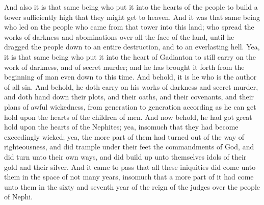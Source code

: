 And also it is that same being who put it into the hearts of the people to build a tower sufficiently high that they might get to heaven. And it was that same being who led on the people who came from that tower into this land; who spread the works of darkness and abominations over all the face of the land, until he dragged the people down to an entire destruction, and to an everlasting hell.
\bverse \iffalse Yea, it is that same being who put it into the heart of Gadianton to still carry on the work of darkness, and of secret murder; and he has brought it forth from the beginning of man even down to this time. \fi
Yea, it is that same being who put it into the heart of Gadianton to still carry on the work of darkness, and of secret murder; and he has brought it forth from the beginning of man even down to this time.
\bverse \iffalse And behold, it is he who is the author of all sin. And behold, he doth carry on his works of darkness and secret murder, and doth hand down their plots, and their oaths, and their covenants, and their plans of awful wickedness, from generation to generation according as he can get hold upon the hearts of the children of men. \fi
And behold, it is he who is the author of all sin. And behold, he doth carry on his works of darkness and secret murder, and doth hand down their plots, and their oaths, and their covenants, and their plans of awful wickedness, from generation to generation according as he can get hold upon the hearts of the children of men.
\bverse \iffalse And now behold, he had got great hold upon the hearts of the Nephites; yea, insomuch that they had become exceedingly wicked; yea, the more part of them had turned out of the way of righteousness, and did trample under their feet the commandments of God, and did turn unto their own ways, and did build up unto themselves idols of their gold and their silver. \fi
And now behold, he had got great hold upon the hearts of the Nephites; yea, insomuch that they had become exceedingly wicked; yea, the more part of them had turned out of the way of righteousness, and did trample under their feet the commandments of God, and did turn unto their own ways, and did build up unto themselves idols of their gold and their silver.
\bverse \iffalse And it came to pass that all these iniquities did come unto them in the space of not many years, insomuch that a more part of it had come unto them in the sixty and seventh year of the reign of the judges over the people of Nephi. \fi
And it came to pass that all these iniquities did come unto them in the space of not many years, insomuch that a more part of it had come unto them in the sixty and seventh year of the reign of the judges over the people of Nephi.
